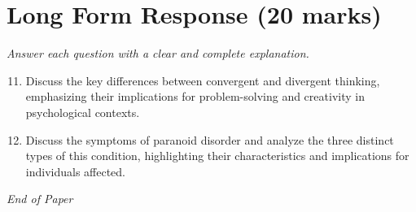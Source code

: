 \documentclass[12pt]{article}
\begin{document}
\section*{Long Form Response (20 marks)}
\textit{Answer each question with a clear and complete explanation.}
\begin{enumerate}[label=\arabic*.]
\setcounter{enumi}{10}
\item Discuss the key differences between convergent and divergent thinking, emphasizing their implications for problem-solving and creativity in psychological contexts.
\item Discuss the symptoms of paranoid disorder and analyze the three distinct types of this condition, highlighting their characteristics and implications for individuals affected.
\end{enumerate}

\vfill
\noindent\textit{End of Paper}
\end{document}
